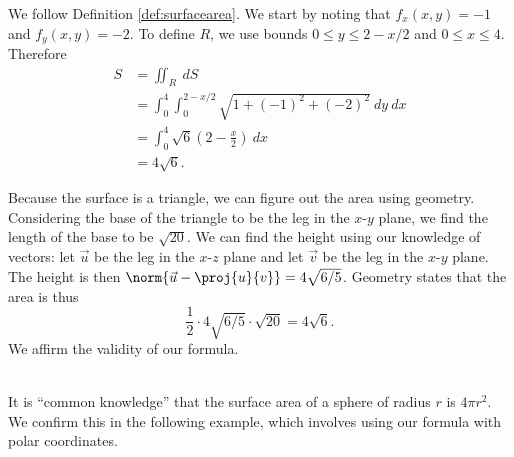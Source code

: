 {We follow Definition \ref{def:surfacearea}. We start by noting that $f_x(x,y) = -1$ and $f_y(x,y) = -2$. To define $R$, we use bounds $0\leq y\leq 2-x/2$ and $0\leq x\leq 4$. Therefore
\begin{align*}
S &= \iint_R\ dS \\
  &= \int_0^4\int_0^{2-x/2} \sqrt{1+(-1)^2+(-2)^2}\ dy\ dx\\
	&= \int_0^4 \sqrt{6}\left(2-\frac x2\right)\ dx\\
	&= 4\sqrt{6}.
\end{align*}

Because the surface is a triangle, we can figure out the area using geometry. Considering the base of the triangle to be the leg in the $x$-$y$ plane, we find the length of the base to be $\sqrt{20}$. We can find the height using our knowledge of vectors: let $\vec u$ be the leg in the $x$-$z$ plane  and let $\vec v$ be the leg in the $x$-$y$ plane. The height is then $\norm {\vec u - \proj{u}{v}} = 4\sqrt{6/5}$. Geometry states that the area is thus
$$\frac 12\cdot4\sqrt{6/5}\cdot\sqrt{20} = 4\sqrt{6}.$$
We affirm the validity of our formula.
}\\

It is ``common knowledge'' that the surface area of a sphere of radius $r$ is $4\pi r^2$. We confirm this in the following example, which involves using our formula with polar coordinates.\\

